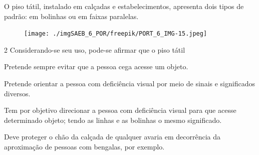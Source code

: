 

O piso tátil, instalado em calçadas e estabelecimentos,
apresenta dois tipos de padrão: em bolinhas ou em faixas paralelas.

\begin{figure}[H]
\centering\texttt{[image: ./imgSAEB\_6\_POR/freepik/PORT\_6\_IMG-15.jpeg]}
\end{figure}

\num{2} Considerando-se seu uso, pode-se afirmar que o piso tátil

\begin{escolha}
\item Pretende sempre evitar que a pessoa cega acesse um objeto.
\item Pretende orientar a pessoa com deficiência visual por meio de sinais
e significados diversos.
\item Tem por objetivo direcionar a pessoa com deficiência visual para que
acesse determinado objeto; tendo as linhas e as bolinhas o mesmo
significado.
\item Deve proteger o chão da calçada de qualquer avaria em decorrência da
aproximação de pessoas com bengalas, por exemplo.
\end{escolha}



